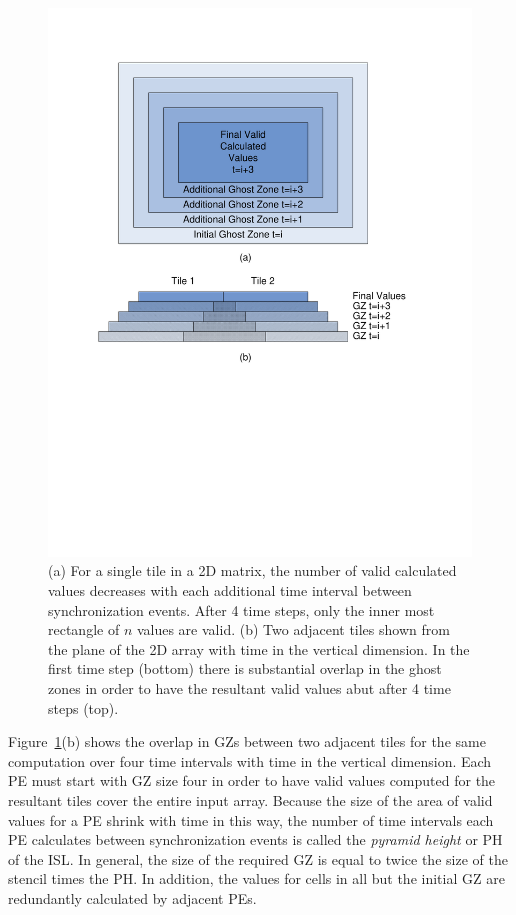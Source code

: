 \documentclass{sig-alternate}
\begin{document}
\begin{figure}
\begin{center}
\includegraphics[width=.9\columnwidth]{figures/Diagrams}
\end{center}
\caption{(a) For a single tile in a 2D matrix, the number of valid calculated
  values decreases with each additional time interval between synchronization
  events.  After 4 time steps, only the inner most rectangle of $n$ values
  are valid.  (b) Two adjacent tiles shown from the plane of the 2D array
  with time in the vertical dimension.  In the first time step (bottom) there
  is substantial overlap in the ghost zones in order to have the resultant
  valid values abut after 4 time steps (top).}
\label{fig:trapezoid}
\end{figure}

Figure~\ref{fig:trapezoid}(b) shows the overlap in GZs between two adjacent
tiles for the same computation over four time intervals with time in the
vertical dimension.  Each PE must start with GZ size four in order to have
valid values computed for the resultant tiles cover the entire input array.
Because the size of the area of valid values for a PE shrink with time in
this way, the number of time intervals each PE calculates between
synchronization events is called the {\em pyramid height} or PH of the ISL.
In general, the size of the required GZ is equal to twice the size of the
stencil times the PH.  In addition, the values for cells in all but the
initial GZ are redundantly calculated by adjacent PEs.
\end{document}
